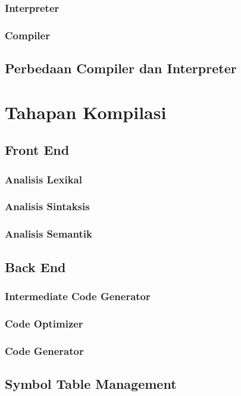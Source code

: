 \documentclass{book}
\begin{document}
              \subsubsection{Interpreter}
              \subsubsection{Compiler}
         \subsection{Perbedaan Compiler dan Interpreter}
    \section{Tahapan Kompilasi}
         \subsection{Front End}
              \subsubsection{Analisis Lexikal}
              \subsubsection{Analisis Sintaksis}
              \subsubsection{Analisis Semantik}
         \subsection{Back End}
              \subsubsection{Intermediate Code Generator}
              \subsubsection{Code Optimizer}
              \subsubsection{Code Generator}
         \subsection{Symbol Table Management}
\end{document}
